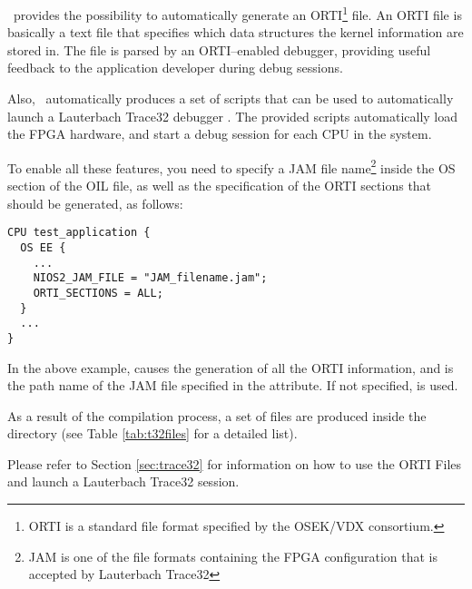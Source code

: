 \rtd\ provides the possibility to automatically generate an
ORTI\footnote{ORTI is a standard file format specified by the OSEK/VDX
consortium.} file.  An ORTI file is basically a text file that
specifies which data structures the kernel information are stored
in. The file is parsed by an ORTI--enabled debugger, providing useful
feedback to the application developer during debug sessions.

Also, \rtd\ automatically produces a set of scripts that can be used
to automatically launch a Lauterbach Trace32 debugger
\cite{Lauterbach}. The provided scripts automatically load the FPGA
hardware, and start a debug session for each CPU in the system.

To enable all these features, you need to specify a JAM file
name\footnote{JAM is one of the file formats containing the FPGA
configuration that is accepted by Lauterbach Trace32} inside the OS
section of the OIL file, as well as the specification of the ORTI
sections that should be generated, as follows:

\begin{lstlisting}
CPU test_application {
  OS EE {
    ...
    NIOS2_JAM_FILE = "JAM_filename.jam";
    ORTI_SECTIONS = ALL;
  }
  ...
}
\end{lstlisting}

In the above example,  causes the generation of all the
ORTI information, and  is the path name of 
the JAM file specified in the  attribute. If not
specified,  is used.

As a result of the compilation process, a set of files are produced
inside the  directory (see Table \ref{tab:t32files} for a
detailed list).

Please refer to Section \ref{sec:trace32} for information on how to
use the ORTI Files and launch a Lauterbach Trace32 session.

